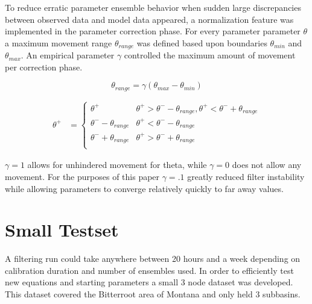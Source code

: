 To reduce erratic parameter ensemble behavior when sudden large discrepancies between observed data and model data appeared, a normalization feature was implemented in the parameter correction phase. For every parameter parameter $\theta$ a maximum movement range $\theta_{range}$ was defined based upon boundaries $\theta_{min}$ and $\theta_{max}$. An empirical parameter $\gamma$ controlled the maximum amount of movement per correction phase. 

\begin{equation}\label{eq:max_movement_thetarange}
\theta_{range} = \gamma(\theta_{max} - \theta_{min})
\end{equation}

\begin{align}\label{eq:max_movement}
\theta^{+} &= \left\{
\begin{array}{ll}
\theta^{+} & \theta^{+} > \theta^{-} - \theta_{range}, \theta^{+} < \theta^{-} + \theta_{range}  \\
\theta^{-} - \theta_{range} & \theta^{+} < \theta^{-} - \theta_{range} \\
\theta^{-} + \theta_{range} & \theta^{+} > \theta^{-} + \theta_{range} \\
\end{array}
\right.
\end{align}


$\gamma = 1$ allows for unhindered movement for theta, while $\gamma = 0$ does not allow any movement. For the purposes of this paper $\gamma = .1$ greatly reduced filter instability while allowing parameters to converge relatively quickly to far away values.

\section{Small Testset}

A filtering run could take anywhere between 20 hours and a week depending on calibration duration and number of ensembles used. In order to efficiently test new equations and starting parameters a small 3 node dataset was developed. This dataset covered the Bitterroot area of Montana and only held 3 subbasins.